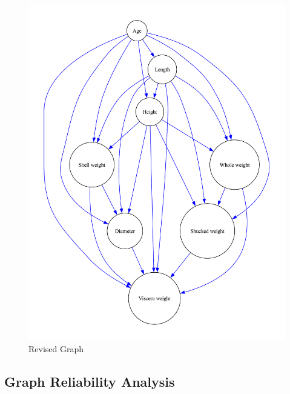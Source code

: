 \documentclass{article}
\begin{document}
\begin{minipage}[t]{0.4\linewidth}
    \begin{figure}[H]
        \centering
        \vspace{-0.5cm}
        \includegraphics[width=\linewidth]{./demo_data/20241104_111650/Abalone/output_graph/revised_graph.pdf}
        \caption{\label{fig:corr}Revised Graph}
    \end{figure}
\end{minipage}

\subsection{Graph Reliability Analysis}
\end{document}
